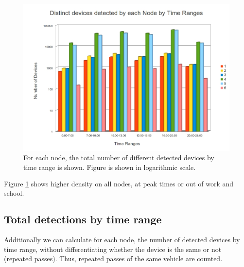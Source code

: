 \documentclass{llncs}
\begin{document}
 \begin{figure}[htb]
 \begin{center}
 \includegraphics[scale=0.4]{VehiculosDiferentesPorHoras.jpg}
 \caption{For each node, the total number of different detected devices by time range is shown. Figure is shown in logarithmic scale.
 \label{VehiculosDiferentesPorHoras}}
 \end{center}
 \end{figure}
 
Figure \ref{VehiculosDiferentesPorHoras} shows higher density on all nodes, at peak times or out of work and school.


\subsection{Total detections by time range}

Additionally we can calculate for each node, the number of detected devices by time range, without differentiating whether the device is the same or not (repeated passes). Thus, repeated passes of the same vehicle are counted.
\end{document}
